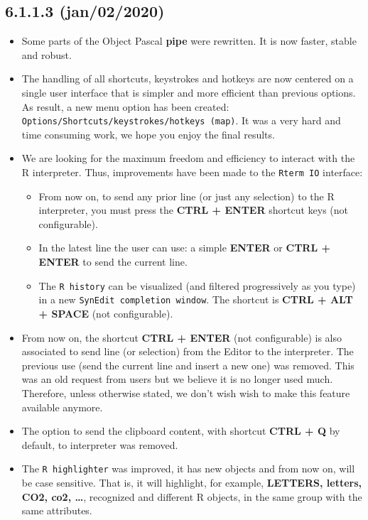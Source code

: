 \subsection*{6.1.1.3 (jan/02/2020)}
\begin{itemize}
  \item Some parts of the Object Pascal \textbf{pipe} were rewritten. It is now faster, stable and robust.
  \item The handling of all shortcuts, keystrokes and hotkeys are now centered on a single user interface
    that is simpler and more efficient than previous options. As result, a new menu option has been
    created: \texttt{Options/Shortcuts/keystrokes/hotkeys (map)}. It was a very hard and time consuming work,
    we hope you enjoy the final results.
  \item We are looking for the maximum freedom and efficiency to interact with the R interpreter.
    Thus, improvements have been made to the \texttt{Rterm IO} interface:
    \begin{itemize}
      \item From now on, to send any prior line (or just any selection) to the R interpreter, you must press the
        \textbf{CTRL + ENTER} shortcut keys (not configurable).
      \item In the latest line the user can use: a simple \textbf{ENTER} or \textbf{CTRL + ENTER} to send the current line.
      \item The \texttt{R history} can be visualized (and filtered progressively as you type) in a new \texttt{SynEdit completion window}.
        The shortcut is \textbf{CTRL + ALT + SPACE} (not configurable).
    \end{itemize}
  \item From now on, the shortcut \textbf{CTRL + ENTER} (not configurable) is also associated to send line (or selection) from the
    Editor to the \RR{} interpreter. The previous use (send the current line and insert a new one) was removed. This was an old request
    from users but we believe it is no longer used much. Therefore, unless otherwise stated, we don't wish wish to make this feature available anymore.
  \item The option to send the clipboard content, with shortcut \textbf{CTRL + Q} by default, to \RR{} interpreter was removed.
  \item The \texttt{R highlighter} was improved, it has new objects and from now on, will be case sensitive. That is, it will highlight, for example,
    \textbf{LETTERS, letters, CO2, co2, \ldots}, recognized and different R objects, in the same group with the same attributes.

\end{itemize}
